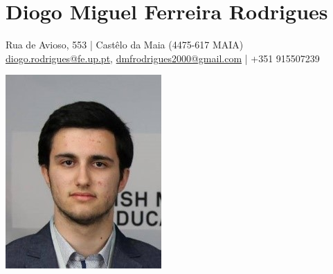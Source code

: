 \documentclass[8pt]{extarticle}
\begin{document}
\thispagestyle{empty}
\noindent
\begin{minipage}[l]{0.75\textwidth}
	\section*{Diogo Miguel Ferreira Rodrigues}
	Rua de Avioso, 553 | Castêlo da Maia (4475-617 MAIA)\\
    \href{mailto:diogo.rodrigues@fe.up.pt}{diogo.rodrigues@fe.up.pt}, \href{mailto:dmfrodrigues2000@gmail.com}{dmfrodrigues2000@gmail.com} | +351 915507239
\end{minipage}%
\begin{minipage}[l]{0.24\textwidth}
	\begin{center} \includegraphics[scale=1]{cv_photo.jpg} \end{center}
\end{minipage}
\end{document}
